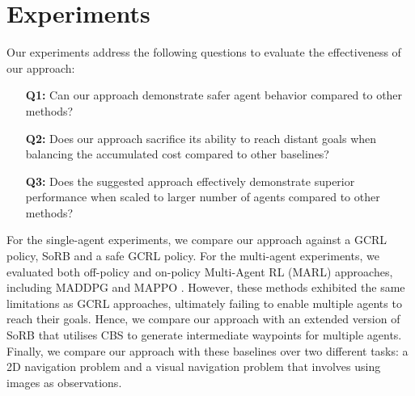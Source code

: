 \documentclass[letterpaper, 10 pt, conference]{IEEEConference}
\begin{document}
\section{Experiments}
\label{experiments}

Our experiments address the following questions to evaluate the effectiveness of our approach:

\begin{itemize}[noitemsep, align=left]
\item[\textbf{Q1:}] Can our approach demonstrate safer agent behavior compared to other methods?
\item[\textbf{Q2:}] Does our approach sacrifice its ability to reach distant goals when balancing the accumulated cost compared to other baselines?
\item[\textbf{Q3:}] Does the suggested approach effectively demonstrate superior performance when scaled to larger number of agents compared to other methods?
\end{itemize}

For the single-agent experiments, we compare our approach against a GCRL policy, SoRB and a safe GCRL policy. For the multi-agent experiments, we evaluated both off-policy and on-policy Multi-Agent RL (MARL) approaches, including MADDPG \cite{lowe2020multiagentactorcriticmixedcooperativecompetitive} and MAPPO \cite{yu2022surprisingeffectivenessppocooperative}. However, these methods exhibited the same limitations as GCRL approaches, ultimately failing to enable multiple agents to reach their goals. Hence, we compare our approach with an extended version of SoRB that utilises CBS to generate intermediate waypoints for multiple agents. Finally, we compare our approach with these baselines over two different tasks: a 2D navigation problem and a visual navigation problem that involves using images as observations.
\end{document}
